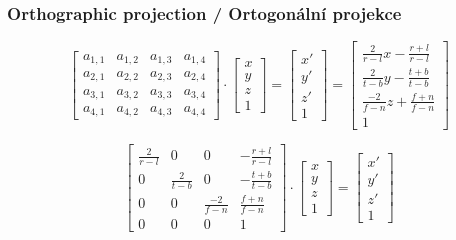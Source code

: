 \begin{frame}
\frametitle{Orthographic projection / Ortogonální projekce}
$$
\left[
\begin{array}{cccc} 
a_{1,1} & a_{1,2} & a_{1,3} & a_{1,4} \\
a_{2,1} & a_{2,2} & a_{2,3} & a_{2,4} \\
a_{3,1} & a_{3,2} & a_{3,3} & a_{3,4} \\
a_{4,1} & a_{4,2} & a_{4,3} & a_{4,4}
\end{array}
\right]
\cdot
\left[
\begin{array}{c}
x \\
y \\
z \\
1
\end{array}
\right]
=
\left[
\begin{array}{c} 
x' \\
y' \\
z' \\
1
\end{array}
\right]
=
\left[
\begin{array}{c} 
\frac{2}{r-l}x - \frac{r+l}{r-l}\\
\frac{2}{t-b}y - \frac{t+b}{t-b}\\
\frac{-2}{f-n}z + \frac{f+n}{f-n}\\
1
\end{array}
\right]
$$

$$
\left[
\begin{array}{cccc} 
\frac{2}{r-l} & 0             & 0              & -\frac{r+l}{r-l} \\
0             & \frac{2}{t-b} & 0              & -\frac{t+b}{t-b} \\
0             & 0             & \frac{-2}{f-n} & \frac{f+n}{f-n} \\
0             & 0             & 0              & 1
\end{array}
\right]
\cdot
\left[
\begin{array}{c}
x \\
y \\
z \\
1
\end{array}
\right]
=
\left[
\begin{array}{c} 
x' \\
y' \\
z' \\
1
\end{array}
\right]
$$
\end{frame}

